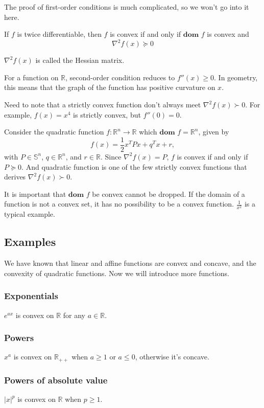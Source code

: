 \documentclass[lang=en,color=blue,mode=fancy,titlestyle=hang]{elegantbook}
\begin{document}
The proof of first-order conditions is much complicated, so we won't go into it here.

If $f$ is twice differentiable, then $f$ is convex if and only if $\textbf{dom } f$ is
convex and
\[
\nabla^2 f(x) \succeq 0
\]

$\nabla^2 f(x)$ is called the Hessian matrix.

For a function on $\mathbb{R}$, second-order condition reduces to $f''(x) \geq 0$. In geometry,
this means that the graph of the function has positive curvature on $x$.

Need to note that a strictly convex function don't always meet $\nabla^2 f(x) \succ 0$. For
example, $f(x) = x^4$ is strictly convex, but $f''(0) = 0$.

Consider the quadratic function $f: \mathbb{R}^n \rightarrow \mathbb{R}$ which
$\textbf{dom } f = \mathbb{R}^n$, given by
\[
f(x) = \frac12 x^T P x + q^T x + r,
\]
with $P \in \mathbb{S}^n$, $q \in \mathbb{R}^n$, and $r \in \mathbb{R}$. Since
$\nabla^2 f(x) = P$, $f$ is convex if and only if $P \succeq 0$. And quadratic function
is one of the few strictly convex functions that derives $\nabla^2 f(x) \succ 0$.

It is important that $\textbf{dom } f$ be convex cannot be dropped. If the domain of a
function is not a convex set, it has no possibility to be a convex function. $\frac{1}{x^2}$
is a typical example.

\subsection{Examples}

We have known that linear and affine functions are convex and concave, and the convexity of
quadratic functions. Now we will introduce more functions.

\subsubsection{Exponentials} $e^{ax}$ is convex on $\mathbb{R}$ for any $a \in \mathbb{R}$.

\subsubsection{Powers} $x^a$ is convex on $\mathbb{R}_{++}$ when $a \geq 1$ or $a \leq 0$,
otherwise it's concave.

\subsubsection{Powers of absolute value} $|x|^p$ is convex on $\mathbb{R}$ when $p \geq 1$.
\end{document}
